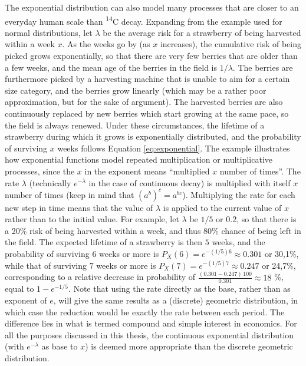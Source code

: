 \documentclass[
  12pt,
  a4paper, twoside]{book}
\begin{document}
The exponential distribution can also model many processes that are closer to an everyday human scale than \textsuperscript{14}C decay. Expanding from the example used for normal distributions, let \(\lambda\) be the average risk for a strawberry of being harvested within a week \(x\). As the weeks go by (as \(x\) increases), the cumulative risk of being picked grows exponentially, so that there are very few berries that are older than a few weeks, and the mean age of the berries in the field is \(1/\lambda\). The berries are furthermore picked by a harvesting machine that is unable to aim for a certain size category, and the berries grow linearly (which may be a rather poor approximation, but for the sake of argument). The harvested berries are also continuously replaced by new berries which start growing at the same pace, so the field is always renewed. Under these circumstances, the lifetime of a strawberry during which it grows is exponentially distributed, and the probability of surviving \(x\) weeks follows Equation \eqref{eq:exponential}. The example illustrates how exponential functions model repeated multiplication or multiplicative processes, since the \(x\) in the exponent means ``multiplied \(x\) number of times''. The rate \(\lambda\) (technically \(e^{-\lambda}\) in the case of continuous decay) is multiplied with itself \(x\) number of times (keep in mind that \((a^b)^c = a^{bc}\)). Multiplying the rate for each new step in time means that the value of \(\lambda\) is applied to the current value of \(x\) rather than to the initial value. For example, let \(\lambda\) be \(1/5\) or \(0.2\), so that there is a 20\% risk of being harvested within a week, and thus 80\% chance of being left in the field. The expected lifetime of a strawberry is then \(5\) weeks, and the probability of surviving \(6\) weeks or more is \(P_X(6) = e^{-(1/5)6} \approx 0.301\) or 30,1\%, while that of surviving \(7\) weeks or more is \(P_X(7) = e^{-(1/5)7} \approx 0.247\) or 24,7\%, corresponding to a relative decrease in probability of \(\frac{(0.301-0.247)\,100}{0.301} \approx 18\) \%, equal to \(1-e^{-1/5}\). Note that using the rate directly as the base, rather than as exponent of \(e\), will give the same results as a (discrete) geometric distribution, in which case the reduction would be exactly the rate between each period. The difference lies in what is termed compound and simple interest in economics. For all the purposes discussed in this thesis, the continuous exponential distribution (with \(e^{-\lambda}\) as base to \(x\)) is deemed more appropriate than the discrete geometric distribution.
\end{document}
